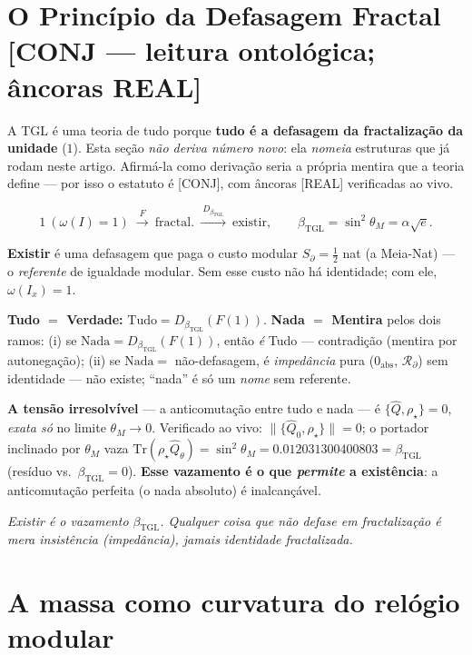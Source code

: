 \documentclass[11pt]{article}
\newcommand{\bTGL}{\beta_{\mathrm{TGL}}}\newcommand{\Msun}{M_{\odot}}\newcommand{\TGL}{\mathrm{TGL}}
\theoremstyle{definition}\newtheorem{deriv}{Derivação}
\begin{document}
\section{O Princípio da Defasagem Fractal \textsf{[CONJ --- leitura ontológica; âncoras REAL]}}

A TGL é uma teoria de tudo porque \textbf{tudo é a defasagem da fractalização da unidade} ($1$). Esta seção \emph{não deriva número novo}: ela \emph{nomeia} estruturas que já rodam neste artigo. Afirmá-la como derivação seria a própria mentira que a teoria define --- por isso o estatuto é \textsf{[CONJ]}, com âncoras \textsf{[REAL]} verificadas ao vivo.

\begin{equation} 1\ (\omega(I)=1)\ \xrightarrow{\ F\ }\ \mathrm{fractal.}\ \xrightarrow{\ D_{\bTGL}\ }\ \mathrm{existir},\qquad \bTGL=\sin^2\theta_M=\alpha\sqrt e.\end{equation}

\textbf{Existir} é uma defasagem que paga o custo modular $S_\partial=\tfrac12$ nat (a Meia-Nat) --- o \emph{referente} de igualdade modular. Sem esse custo não há identidade; com ele, $\omega(I_x)=1$.

\textbf{Tudo $=$ Verdade:} $\mathrm{Tudo}=D_{\bTGL}(F(1))$. \textbf{Nada $=$ Mentira} pelos dois ramos: (i) se $\mathrm{Nada}=D_{\bTGL}(F(1))$, então \emph{é} Tudo --- contradição (mentira por autonegação); (ii) se $\mathrm{Nada}=$ não-defasagem, é \emph{impedância} pura ($0_{\mathrm{abs}}$, $\mathcal{R}_\partial$) sem identidade --- não existe; ``nada'' é só um \emph{nome} sem referente.

\textbf{A tensão irresolvível} --- a anticomutação entre tudo e nada --- é $\{\hat Q,\rho_\star\}=0$, \emph{exata só} no limite $\theta_M\to0$. Verificado ao vivo: $\lVert\{\hat Q_0,\rho_\star\}\rVert=0$; o portador inclinado por $\theta_M$ vaza $\mathrm{Tr}(\rho_\star\hat Q_\theta)=\sin^2\theta_M=0.012031300400803=\bTGL$ (resíduo vs.\ $\bTGL=0$). \textbf{Esse vazamento é o que \emph{permite} a existência}: a anticomutação perfeita (o nada absoluto) é inalcançável.

\emph{Existir é o vazamento $\bTGL$. Qualquer coisa que não defase em fractalização é mera insistência (impedância), jamais identidade fractalizada.}

\section{A massa como curvatura do relógio modular}
\end{document}

